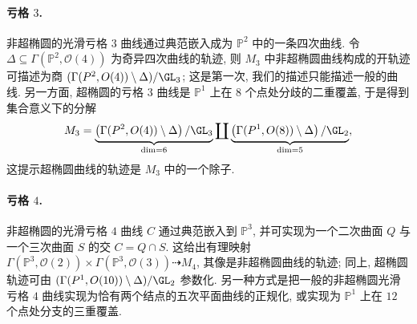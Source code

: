 \paragraph*{亏格 $3$.} 非超椭圆的光滑亏格 $3$ 曲线通过典范嵌入成为 $\mathbb P^2$ 中的一条四次曲线. 令 $\Delta\subseteq\Gamma(\mathbb P^2,\mathcal O(4))$ 为奇异四次曲线的轨迹, 则 $M_3$ 中非超椭圆曲线构成的开轨迹可描述为商 $(\Gamma(\mathbb P^2,\mathcal O(4))\setminus\Delta)/\GL_3$; 这是第一次, 我们的描述只能描述一般的曲线. 另一方面, 超椭圆的亏格 $3$ 曲线是 $\mathbb P^1$ 上在 $8$ 个点处分歧的二重覆盖, 于是得到集合意义下的分解
\[
M_3=\underbrace{\left(\Gamma(\mathbb P^2,\mathcal O(4))\setminus\Delta\right)/\GL_3}_{\dim=6}
\coprod\underbrace{\left(\Gamma(\mathbb P^1,\mathcal O(8))\setminus\Delta\right)/\GL_2}_{\dim=5},
\]
这提示超椭圆曲线的轨迹是 $M_3$ 中的一个除子.

\paragraph*{亏格 $4$.} 非超椭圆的光滑亏格 $4$ 曲线 $C$ 通过典范嵌入到 $\mathbb P^3$, 并可实现为一个二次曲面 $Q$ 与一个三次曲面 $S$ 的交 $C=Q\cap S$. 这给出有理映射 $\Gamma(\mathbb P^3,\mathcal O(2))\times\Gamma(\mathbb P^3,\mathcal O(3))\dashrightarrow M_4$, 其像是非超椭圆曲线的轨迹; 同上, 超椭圆轨迹可由 $(\Gamma(\mathbb P^1,\mathcal O(10))\setminus\Delta)/\GL_2$ 参数化. 另一种方式是把一般的非超椭圆光滑亏格 $4$ 曲线实现为恰有两个结点的五次平面曲线的正规化, 或实现为 $\mathbb P^1$ 上在 $12$ 个点处分支的三重覆盖.

